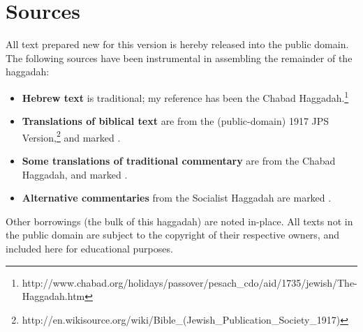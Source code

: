 \documentclass[letter,11pt,openany]{memoir}
\newcommand{\CSrc}{}
\newcommand{\JSrc}{\textsuperscript{\upshape{[J]}}}
\newcommand{\LSrc}{\textsuperscript{\upshape{[L]}}}
\newcommand{\SSrc}{\textsuperscript{\upshape{[S]}}}
\begin{document}
\section*{Sources}

All text prepared new for this version is 
hereby released
into the public domain. The following sources have been instrumental in
assembling the remainder of the haggadah:
\begin{itemize}
  \item {\bfseries Hebrew text} is traditional; my reference has been the Chabad
    Haggadah.\footnote{http://www.chabad.org/holidays/passover/pesach\_cdo/aid/1735/jewish/The-Haggadah.htm}
  \item {\bfseries Translations of biblical text} are from the (public-domain)
    1917 JPS
    Version,\footnote{http://en.wikisource.org/wiki/Bible\_(Jewish\_Publication\_Society\_1917)}
    and marked \JSrc.
  \item {\bfseries Some translations of traditional commentary} are from the
    Chabad Haggadah, and marked \LSrc.
  \item {\bfseries Alternative commentaries} from the Socialist Haggadah
    are marked \SSrc.
\end{itemize}
Other borrowings (the bulk of this haggadah) are noted in-place. All texts not
in the public domain are subject to the copyright of their respective owners,
and included here for educational purposes.
\end{document}
